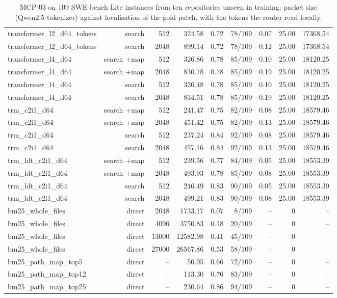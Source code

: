 \begin{table}[t]
\begin{adjustbox}{max width=\linewidth}
\begin{tabular}{lrrrrrrrr}
transformer\_l2\_d64\_tokens & search & 512 & 324.58 & 0.72 & 78/109 & 0.07 & 25.00 & 17368.54 \\
transformer\_l2\_d64\_tokens & search & 2048 & 899.14 & 0.72 & 78/109 & 0.12 & 25.00 & 17368.54 \\
transformer\_l4\_d64 & search +map & 512 & 326.86 & 0.78 & 85/109 & 0.10 & 25.00 & 18120.25 \\
transformer\_l4\_d64 & search +map & 2048 & 830.78 & 0.78 & 85/109 & 0.19 & 25.00 & 18120.25 \\
transformer\_l4\_d64 & search & 512 & 326.48 & 0.78 & 85/109 & 0.10 & 25.00 & 18120.25 \\
transformer\_l4\_d64 & search & 2048 & 834.51 & 0.78 & 85/109 & 0.19 & 25.00 & 18120.25 \\
trm\_c2i1\_d64 & search +map & 512 & 241.47 & 0.75 & 82/109 & 0.08 & 25.00 & 18579.46 \\
trm\_c2i1\_d64 & search +map & 2048 & 451.42 & 0.75 & 82/109 & 0.13 & 25.00 & 18579.46 \\
trm\_c2i1\_d64 & search & 512 & 237.24 & 0.84 & 92/109 & 0.08 & 25.00 & 18579.46 \\
trm\_c2i1\_d64 & search & 2048 & 457.16 & 0.84 & 92/109 & 0.13 & 25.00 & 18579.46 \\
trm\_ldt\_c2i1\_d64 & search +map & 512 & 239.56 & 0.77 & 84/109 & 0.05 & 25.00 & 18553.39 \\
trm\_ldt\_c2i1\_d64 & search +map & 2048 & 493.93 & 0.78 & 85/109 & 0.08 & 25.00 & 18553.39 \\
trm\_ldt\_c2i1\_d64 & search & 512 & 246.49 & 0.83 & 90/109 & 0.05 & 25.00 & 18553.39 \\
trm\_ldt\_c2i1\_d64 & search & 2048 & 499.21 & 0.83 & 90/109 & 0.08 & 25.00 & 18553.39 \\
bm25\_whole\_files & direct & 2048 & 1733.17 & 0.07 & 8/109 & -- & 0 & -- \\
bm25\_whole\_files & direct & 4096 & 3750.83 & 0.18 & 20/109 & -- & 0 & -- \\
bm25\_whole\_files & direct & 13000 & 12582.98 & 0.41 & 45/109 & -- & 0 & -- \\
bm25\_whole\_files & direct & 27000 & 26567.86 & 0.53 & 58/109 & -- & 0 & -- \\
bm25\_path\_map\_top5 & direct & -- & 50.95 & 0.66 & 72/109 & -- & 0 & -- \\
bm25\_path\_map\_top12 & direct & -- & 113.30 & 0.76 & 83/109 & -- & 0 & -- \\
bm25\_path\_map\_top25 & direct & -- & 230.64 & 0.86 & 94/109 & -- & 0 & -- \\
\bottomrule
\end{tabular}
\end{adjustbox}
\caption{MCP-03 on 109 SWE-bench Lite instances from ten repositories unseen in training: packet size (Qwen2.5 tokenizer) against localisation of the gold patch, with the tokens the router read locally.}
\label{tab:mcp03-packets}
\end{table}
